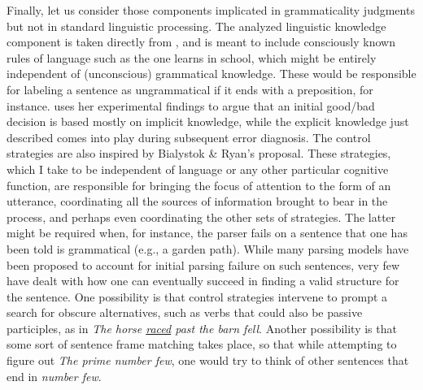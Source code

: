 Finally, let us consider those components implicated in grammaticality judgments but not in standard linguistic processing. The analyzed linguistic knowledge component is taken directly from \citet{BialystokEtAl1985}, and is meant to include consciously known rules of language such as the  one learns in school, which might be entirely independent of (unconscious) grammatical knowledge. These would be responsible for labeling a sentence as ungrammatical if it ends with a preposition, for instance. \citet{Bialystok1979} uses her experimental findings to argue that an initial good/bad decision is based mostly on implicit knowledge, while the explicit knowledge just described comes into play during subsequent error diagnosis. The control strategies are also inspired by Bialystok \& Ryan's proposal. These strategies, which I take to be independent of language or any other particular cognitive function, are responsible for bringing the focus of attention to the form of an utterance, coordinating all the sources of information brought to bear in the process, and perhaps even coordinating the other sets of strategies. The latter might be required when, for instance, the parser fails on a sentence that one has been told is grammatical (e.g., a garden path). While many parsing models have been proposed to account for initial parsing failure on such sentences, very few have dealt with how one can eventually succeed in finding a valid structure for the sentence. One possibility is that control strategies intervene to prompt a search for obscure alternatives, such as verbs that could also be passive participles, as in \textit{The horse \underline{raced} past the barn fell}.
Another possibility is that some sort of sentence frame matching takes place, so that while attempting to figure out \textit{The prime number few}, one would try to think of other sentences that end in \textit{number few}.

